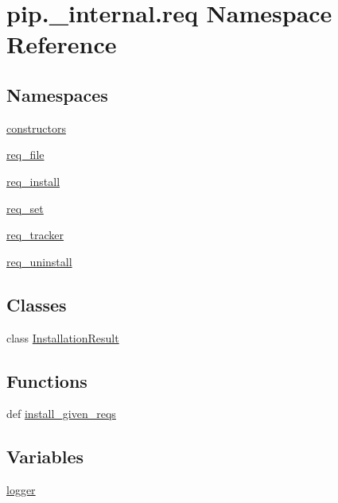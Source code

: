 \hypertarget{namespacepip_1_1__internal_1_1req}{}\section{pip.\+\_\+internal.\+req Namespace Reference}
\label{namespacepip_1_1__internal_1_1req}
\subsection*{Namespaces}
\begin{DoxyCompactItemize}
\item 
 \hyperlink{namespacepip_1_1__internal_1_1req_1_1constructors}{constructors}
\item 
 \hyperlink{namespacepip_1_1__internal_1_1req_1_1req__file}{req\+\_\+file}
\item 
 \hyperlink{namespacepip_1_1__internal_1_1req_1_1req__install}{req\+\_\+install}
\item 
 \hyperlink{namespacepip_1_1__internal_1_1req_1_1req__set}{req\+\_\+set}
\item 
 \hyperlink{namespacepip_1_1__internal_1_1req_1_1req__tracker}{req\+\_\+tracker}
\item 
 \hyperlink{namespacepip_1_1__internal_1_1req_1_1req__uninstall}{req\+\_\+uninstall}
\end{DoxyCompactItemize}
\subsection*{Classes}
\begin{DoxyCompactItemize}
\item 
class \hyperlink{classpip_1_1__internal_1_1req_1_1InstallationResult}{Installation\+Result}
\end{DoxyCompactItemize}
\subsection*{Functions}
\begin{DoxyCompactItemize}
\item 
def \hyperlink{namespacepip_1_1__internal_1_1req_abd43b436256d26dd6f73b989a785bcf3}{install\+\_\+given\+\_\+reqs}
\end{DoxyCompactItemize}
\subsection*{Variables}
\begin{DoxyCompactItemize}
\item 
\hyperlink{namespacepip_1_1__internal_1_1req_ac8b651e06f7e4ca3a12dbc99244c77cf}{logger}
\end{DoxyCompactItemize}


